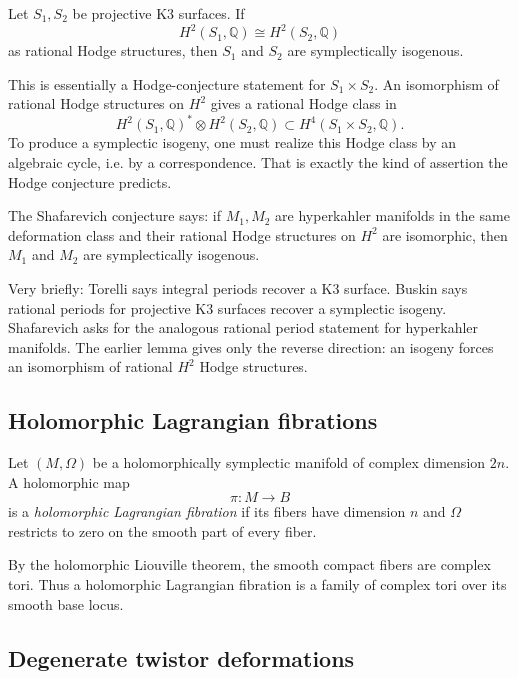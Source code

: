\begin{theorem}[Buskin]
\label{theorem-buskin-k3-isogeny}
Let $S_1,S_2$ be projective K3 surfaces.
If
$$
H^2(S_1,\mathbb{Q})\cong
H^2(S_2,\mathbb{Q})
$$
as rational Hodge structures, then $S_1$ and
$S_2$ are symplectically isogenous.
\end{theorem}

\noindent
This is essentially a Hodge-conjecture
statement for $S_1\times S_2$.
An isomorphism of rational Hodge structures
on $H^2$ gives a rational Hodge class in
$$
H^2(S_1,\mathbb{Q})^*
\otimes H^2(S_2,\mathbb{Q})
\subset H^4(S_1\times S_2,\mathbb{Q}).
$$
To produce a symplectic isogeny, one must
realize this Hodge class by an algebraic
cycle, i.e. by a correspondence.
That is exactly the kind of assertion the
Hodge conjecture predicts.

The Shafarevich conjecture says:
if $M_1,M_2$ are hyperkahler manifolds in
the same deformation class and their rational
Hodge structures on $H^2$ are isomorphic,
then $M_1$ and $M_2$ are symplectically
isogenous.

\medskip
Very briefly: Torelli says integral periods
recover a K3 surface.
Buskin says rational periods for projective
K3 surfaces recover a symplectic isogeny.
Shafarevich asks for the analogous rational
period statement for hyperkahler manifolds.
The earlier lemma gives only the reverse
direction: an isogeny forces an isomorphism
of rational $H^2$ Hodge structures.

\subsection{Holomorphic Lagrangian
fibrations}
\label{subsection-holomorphic-lagrangian-fibrations}

\begin{definition}
\label{definition-holomorphic-lagrangian-fib}
Let $(M,\Omega)$ be a holomorphically
symplectic manifold of complex dimension
$2n$.
A holomorphic map
$$
\pi:M\longrightarrow B
$$
is a {\it holomorphic Lagrangian fibration}
if its fibers have dimension $n$ and
$\Omega$ restricts to zero on the smooth
part of every fiber.
\end{definition}

\noindent
By the holomorphic Liouville theorem, the
smooth compact fibers are complex tori.
Thus a holomorphic Lagrangian fibration is a
family of complex tori over its smooth base
locus.

\subsection{Degenerate twistor deformations}
\label{subsection-degenerate-twistor-deformations}

